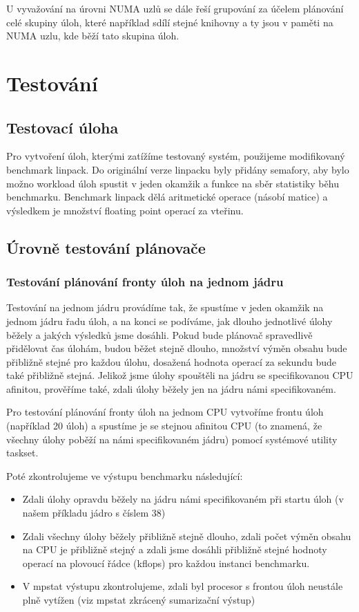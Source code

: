 \documentclass[
  master=true,
  font=sans,
  printversion=false,
  joinlists=true,
  figures=true,
  tables=true,
  sourcecodes=false,
  theorems=false,
  bibencoding=utf8,
  language=czech,
  encoding=utf8,
  field=ainfk,
  biblatex,
  glossaries,
  index
]{kidiplom}
\begin{document}
U vyvažování na úrovni NUMA uzlů se dále řeší grupování za účelem plánování celé skupiny úloh, které například sdílí stejné knihovny a ty jsou v paměti na NUMA uzlu, kde běží tato skupina úloh. 


\section{Testování}

\subsection{Testovací úloha}
Pro vytvoření úloh, kterými zatížíme testovaný systém, použijeme modifikovaný benchmark linpack. Do originální verze linpacku byly přidány semafory, aby bylo možno workload úloh spustit v jeden okamžik a funkce na sběr statistiky běhu benchmarku. Benchmark linpack dělá aritmetické operace (násobí matice) a výsledkem je množství floating point operací za vteřinu. 

\subsection{Úrovně testování plánovače}

\subsubsection{Testování plánování fronty úloh na jednom jádru}

Testování na jednom jádru provádíme tak, že spustíme v jeden okamžik na jednom jádru řadu úloh, a na konci se podíváme, jak dlouho jednotlivé úlohy běžely a jakých výsledků jsme dosáhli. Pokud bude plánovač spravedlivě přidělovat čas úlohám, budou běžet stejně dlouho, množství výměn obsahu bude přibližně stejné pro každou úlohu, dosažená hodnota operací za sekundu bude také přibližně stejná. Jelikož jsme úlohy spouštěli na jádru se specifikovanou CPU afinitou, prověříme také, zdali úlohy běžely jen na jádru námi specifikovaném.

Pro testování plánování fronty úloh na jednom CPU vytvoříme frontu úloh (například 20 úloh) a spustíme je se stejnou afinitou CPU (to znamená, že všechny úlohy poběží na námi specifikovaném jádru) pomocí systémové utility taskset.

Poté zkontrolujeme ve výstupu benchmarku následující:
\begin{itemize}
\item Zdali úlohy opravdu běžely na jádru námi specifikovaném při startu úloh (v našem příkladu jádro s číslem 38)
\item Zdali všechny úlohy běžely přibližně stejně dlouho, zdali počet výměn obsahu na CPU je přibližně stejný  a zdali jsme dosáhli přibližně stejné hodnoty operací na plovoucí řádce (kflops) pro každou instanci benchmarku.
\item V mpstat výstupu zkontrolujeme, zdali byl procesor s frontou úloh neustále plně vytížen (viz mpstat zkrácený sumarizační výstup)\\
\end{itemize}
\end{document}
